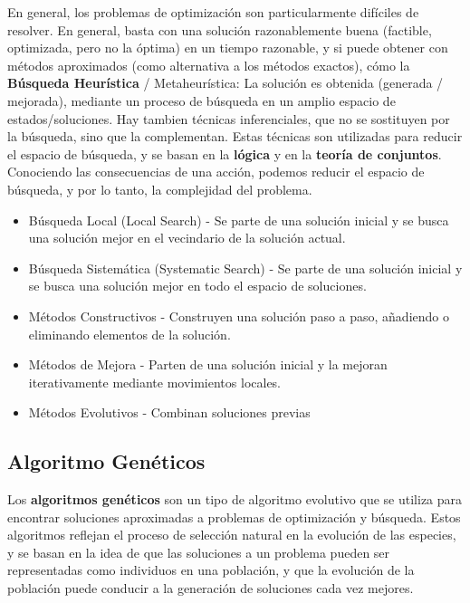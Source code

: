 
En general, los problemas de optimización son particularmente difíciles de resolver.
En general, basta con una solución razonablemente buena (factible, optimizada, pero no la
óptima) en un tiempo razonable, y si puede obtener con métodos aproximados (como alternativa a los métodos exactos), cómo la \textbf{Búsqueda Heurística} / Metaheurística: La solución es obtenida (generada / mejorada), mediante un proceso de búsqueda en un amplio espacio de estados/soluciones.
Hay tambien técnicas inferenciales, que no se sostituyen por la búsqueda, sino que la complementan. Estas técnicas son utilizadas para reducir el espacio de búsqueda, y se basan en la \textbf{lógica} y en la \textbf{teoría de conjuntos}.
Conociendo las consecuencias de una acción, podemos reducir el espacio de búsqueda, y por lo tanto, la complejidad del problema.

\begin{itemize}
   \item Búsqueda Local (Local Search) - Se parte de una solución inicial y se busca una solución mejor en el vecindario de la solución actual.
   \item Búsqueda Sistemática (Systematic Search) - Se parte de una solución inicial y se busca una solución mejor en todo el espacio de soluciones.
\end{itemize}

\begin{itemize}
   \item Métodos Constructivos - Construyen una solución paso a paso, añadiendo o eliminando elementos de la solución.
   \item Métodos de Mejora - Parten de una solución inicial y la mejoran iterativamente mediante movimientos locales.
   \item Métodos Evolutivos - Combinan soluciones previas
\end{itemize}


\subsection{Algoritmo Genéticos}
Los \textbf{algoritmos genéticos} son un tipo de algoritmo evolutivo que se utiliza para encontrar soluciones aproximadas a problemas de optimización y búsqueda. Estos algoritmos reflejan el proceso de selección natural en la evolución de las especies, y se basan en la idea de que las soluciones a un problema pueden ser representadas como individuos en una población, y que la evolución de la población puede conducir a la generación de soluciones cada vez mejores.

